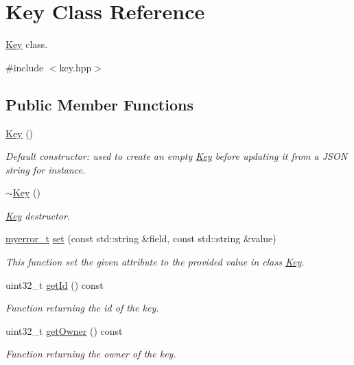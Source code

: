 \hypertarget{classKey}{}\section{Key Class Reference}
\label{classKey}


\hyperlink{classKey}{Key} class.  




{\ttfamily \#include $<$key.\+hpp$>$}

\subsection*{Public Member Functions}
\begin{DoxyCompactItemize}
\item 
\hyperlink{classKey_a22e51dbebb18c1d33ee8bba93a1b3b4d}{Key} ()
\begin{DoxyCompactList}\small\item\em Default constructor\+: used to create an empty \hyperlink{classKey}{Key} before updating it from a J\+S\+O\+N string for instance. \end{DoxyCompactList}\item 
\hyperlink{classKey_a92ff6ee5df282f6d7abb893fd14d81af}{$\sim$\+Key} ()
\begin{DoxyCompactList}\small\item\em \hyperlink{classKey}{Key} destructor. \end{DoxyCompactList}\item 
\hyperlink{error_8hpp_acabd2917084445509becf54ab64a4bd0}{myerror\+\_\+t} \hyperlink{classKey_a21f962eefb398f5dd315f70455cb4e5f}{set} (const std\+::string \&field, const std\+::string \&value)
\begin{DoxyCompactList}\small\item\em This function set the given attribute to the provided value in class \hyperlink{classKey}{Key}. \end{DoxyCompactList}\item 
uint32\+\_\+t \hyperlink{classKey_a080b9b546a6a2d7eaa0e8c67f35810fd}{get\+Id} () const 
\begin{DoxyCompactList}\small\item\em Function returning the id of the key. \end{DoxyCompactList}\item 
uint32\+\_\+t \hyperlink{classKey_a8f3479bf9c4db9573a5fe4919937a3eb}{get\+Owner} () const 
\begin{DoxyCompactList}\small\item\em Function returning the owner of the key. \end{DoxyCompactList}\item 

\end{DoxyCompactItemize}
